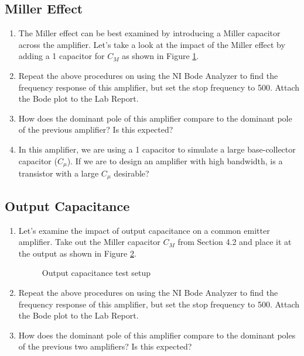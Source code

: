 \documentclass{article}
\begin{document}
\subsection{Miller Effect}
\begin{enumerate}

	\begin{figure}[!htb]
		
		\centerline{\box\graph}
		\caption{Miller capacitor test setup}
		\label{millerlab}
	\end{figure}

	\item The Miller effect can be best examined by introducing a Miller capacitor across the amplifier. Let's take a look at the impact of the Miller effect by adding a \unit{1}{\nano\farad} capacitor for $C_M$ as shown in Figure \ref{millerlab}.

	\item Repeat the above procedures on using the NI Bode Analyzer to find the frequency response of this amplifier, but set the stop frequency to \unit{500}{\kilo\hertz}. Attach the Bode plot to the Lab Report.

	\item How does the dominant pole of this amplifier compare to the dominant pole of the previous amplifier? Is this expected?

	\item In this amplifier, we are using a \unit{1}{\nano\farad} capacitor to simulate a large base-collector capacitor ($C_{\mu}$). If we are to design an amplifier with high bandwidth, is a transistor with a large $C_{\mu}$ desirable?

\end{enumerate}

\subsection{Output Capacitance}
\begin{enumerate}
	\item Let's examine the impact of output capacitance on a common emitter amplifier. Take out the Miller capacitor $C_M$ from Section 4.2 and place it at the output as shown in Figure \ref{outputcap}.

	\begin{figure}[!htb]
		
		\centerline{\box\graph}
		\caption{Output capacitance test setup}
		\label{outputcap}
	\end{figure}

	\item Repeat the above procedures on using the NI Bode Analyzer to find the frequency response of this amplifier, but set the stop frequency to \unit{500}{\kilo\hertz}. Attach the Bode plot to the Lab Report.

	\item How does the dominant pole of this amplifier compare to the dominant poles of the previous two amplifiers? Is this expected?

\end{enumerate}
\end{document}
